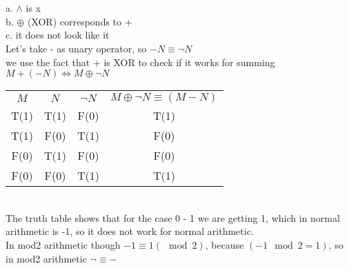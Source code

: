 \documentclass{article}
\begin{document}
\section{}
a. $\wedge$ is x \\
b. $\oplus$ (XOR) corresponds to + \\
c. it does not look like it \\
Let's take - as unary operator, so $-N \equiv \neg N$ \\
we use the fact that + is XOR to check if it works for summing \\
$M + (-N) \Leftrightarrow M \oplus \neg N$\\
\begin{tabular}{ c c c c }
  $M$  & $N$  & $\neg N$ & $M \oplus \neg N \equiv (M - N)$ \\
  T(1) & T(1) & F(0)     & T(1)                             \\
  T(1) & F(0) & T(1)     & F(0)                             \\
  F(0) & T(1) & F(0)     & F(0)                             \\
  F(0) & F(0) & T(1)     & T(1)                             \\
\end{tabular} \\
The truth table shows that for the case 0 - 1 we are getting 1, which in normal arithmetic is -1, so it does not work for normal arithmetic. \\
In mod2 arithmetic though $-1 \equiv 1 (\mod 2)$, because $(-1 \mod 2 = 1)$, so in mod2 arithmetic $\neg \equiv -$\\
\end{document}

